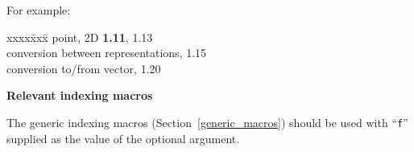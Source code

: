\documentclass{article}
\newenvironment{indexex}{\begin{tabbing}
xxxx\=xxx\=\kill}{\end{tabbing}}
\begin{document}
\begin{description}
        For example:
        \begin{indexex}
        point, 2D                                           {\bf 1.11},
                                                                 1.13 \\
        \>  conversion between representations,                  1.15 \\
        \>  conversion to/from vector,                           1.20\\
        \end{indexex}

   \item {\bf Relevant indexing macros}

         The generic indexing macros (Section~\ref{generic_macros}) should 
         be used with ``{\tt f}'' supplied as the value of the optional argument.

\end{description}
\end{document}
